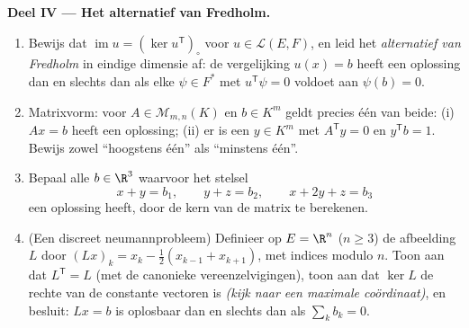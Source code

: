 \begin{problem}
\medskip
\noindent\textbf{Deel IV --- Het alternatief van Fredholm.}
\begin{enumerate}[resume]
  \item Bewijs dat $\operatorname{im} u = (\ker u^{\mathsf
        T})_\circ$ voor $u \in \mathcal{L}(E, F)$, en leid het
        \emph{alternatief van Fredholm} in eindige dimensie af: de
        vergelijking $u(x) = b$ heeft een oplossing dan en slechts
        dan als elke $\psi \in F^*$ met $u^{\mathsf T}\psi = 0$
        voldoet aan $\psi(b) = 0$.
  \item Matrixvorm: voor $A \in \mathcal{M}_{m,n}(K)$ en $b \in
        K^m$ geldt precies één van beide: (i) $Ax = b$ heeft een
        oplossing; (ii) er is een $y \in K^m$ met $A^{\mathsf T}y
        = 0$ en $y^{\mathsf T}b = 1$. Bewijs zowel ``hoogstens
        één'' als ``minstens één''.
  \item Bepaal alle $b \in \R^3$ waarvoor het stelsel
        \[
        x + y = b_1, \qquad y + z = b_2, \qquad x + 2y + z = b_3
        \]
        een oplossing heeft, door de kern van de 
        matrix te berekenen.
  \item (Een discreet neumannprobleem) Definieer op $E = \R^n$ ($n
        \geq 3$) de afbeelding $L$ door $(Lx)_k = x_k -
        \frac12(x_{k-1} + x_{k+1})$, met indices modulo $n$. Toon
        aan dat $L^{\mathsf T} = L$ (met de canonieke
        vereenzelvigingen), toon aan dat $\ker L$ de rechte van de
        constante vectoren is \emph{(kijk naar een maximale
        coördinaat)}, en besluit: $Lx = b$ is oplosbaar dan en
        slechts dan als $\sum_k b_k = 0$.
\end{enumerate}


\end{problem}
